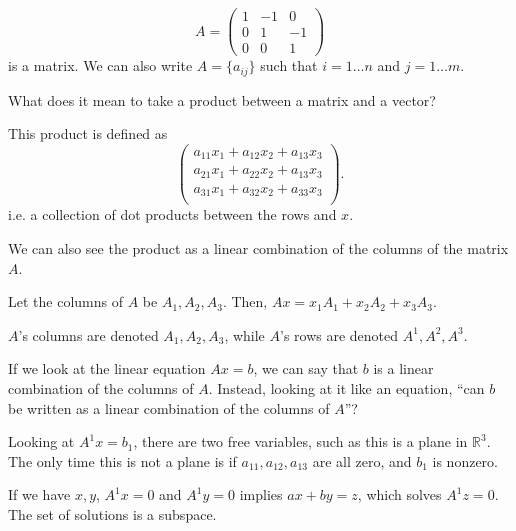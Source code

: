
\begin{eg}
	\[
		A = \begin{pmatrix}
			1 & -1 & 0 \\ 0 & 1 & -1 \\ 0 & 0 & 1
		\end{pmatrix}
	\] is a matrix. We can also write \( A = \{a_{ij}\}   \) such that \( i = 1\ldots n \) and \( j = 1\ldots m \).
\end{eg}

What does it mean to take a product between a matrix and a vector?

\begin{definition}
	This product is defined as \[
		\begin{pmatrix}
			a_{11}x_{1} + a_{12}x_{2} + a_{13}x_{3} \\
			a_{21}x_{1} + a_{22}x_{2} + a_{13}x_{3} \\
			a_{31}x_{1} + a_{32}x_{2} + a_{33}x_{3} \\
		\end{pmatrix}
	.\] i.e. a collection of dot products between the rows and \( x \).
\end{definition}

We can also see the product as a linear combination of the columns of the matrix \( A \).

\begin{definition}
	Let the columns of \( A \) be \( A_{1},A_{2},A_{3} \). Then, \( Ax=x_{1}A_{1} + x_{2}A_{2} + x_{3}A_{3} \).
\end{definition}

\begin{notation}
	\( A \)'s columns are denoted \( A_1, A_{2}, A_{3} \), while \( A \)'s rows are denoted \( A^{1}, A^{2}, A^{3}    \).
\end{notation}

If we look at the linear equation \( Ax=b \), we can say that \( b \) is a linear combination of the columns of \( A \). Instead, looking at it like an equation, ``can \( b \) be written as a linear combination of the columns of \( A \)''?

Looking at \( A^{1}x = b_1  \), there are two free variables, such as this is a plane in \( \mathbb{R}^3 \). The only time this is not a plane is if \( a_{11},a_{12},a_{13} \) are all zero, and \( b_{1} \) is nonzero.

If we have \( x,y \), \( A^{1}x=0  \) and \( A^{1}y=0  \) implies \( ax + by = z \), which solves \( A^{1}z=0  \). The set of solutions is a subspace.

